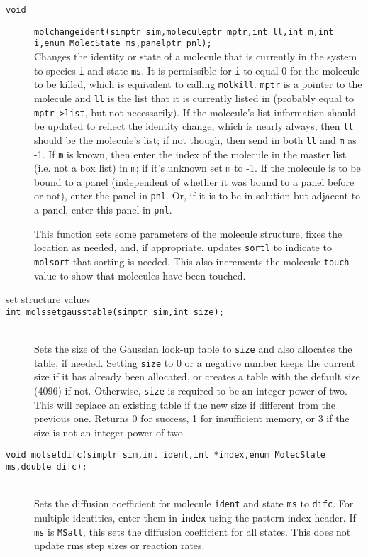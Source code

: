 \documentclass {book}
\begin{document}
\begin{description}
\item[\texttt{void}]
\texttt{molchangeident(simptr sim,moleculeptr mptr,int ll,int m,int i,enum MolecState ms,panelptr pnl);} \\
Changes the identity or state of a molecule that is currently in the system to species \texttt{i} and state \texttt{ms}.  It is permissible for \texttt{i} to equal 0 for the molecule to be killed, which is equivalent to calling \texttt{molkill}.  \texttt{mptr} is a pointer to the molecule and \texttt{ll} is the list that it is currently listed in (probably equal to \texttt{mptr->list}, but not necessarily).  If the molecule's list information should be updated to reflect the identity change, which is nearly always, then \texttt{ll} should be the molecule's list; if not though, then send in both \texttt{ll} and \texttt{m} as -1.  If \texttt{m} is known, then enter the index of the molecule in the master list (i.e. not a box list) in \texttt{m}; if it's unknown set \texttt{m} to -1.  If the molecule is to be bound to a panel (independent of whether it was bound to a panel before or not), enter the panel in \texttt{pnl}.  Or, if it is to be in solution but adjacent to a panel, enter this panel in \texttt{pnl}.

This function sets some parameters of the molecule structure, fixes the location as needed, and, if appropriate, updates \texttt{sortl} to indicate to \texttt{molsort} that sorting is needed.  This also increments the molecule \texttt{touch} value to show that molecules have been touched.

\item[\underline{set structure values}]

\item[\texttt{int molssetgausstable(simptr sim,int size);}]
\hfill \\
Sets the size of the Gaussian look-up table to \texttt{size} and also allocates the table, if needed.  Setting \texttt{size} to 0 or a negative number keeps the current size if it has already been allocated, or creates a table with the default size (4096) if not.  Otherwise, \texttt{size} is required to be an integer power of two.  This will replace an existing table if the new size if different from the previous one.  Returns 0 for success, 1 for insufficient memory, or 3 if the size is not an integer power of two.

\item[\texttt{void molsetdifc(simptr sim,int ident,int *index,enum MolecState ms,double difc);}]
\hfill \\
Sets the diffusion coefficient for molecule \texttt{ident} and state \texttt{ms} to \texttt{difc}.  For multiple identities, enter them in \texttt{index} using the pattern index header.  If \texttt{ms} is \texttt{MSall}, this sets the diffusion coefficient for all states.  This does not update rms step sizes or reaction rates.


\end{description}
\end{document}
